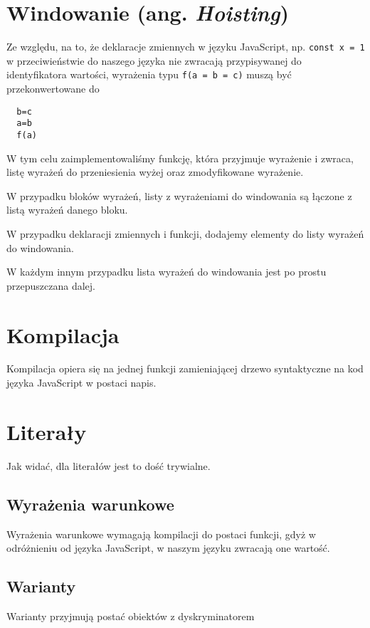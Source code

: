 \documentclass[a4paper,12pt]{book} %
\begin{document}
\section{Windowanie (ang. \emph{Hoisting})}
Ze względu, na to, że deklaracje zmiennych w języku JavaScript, np. \lstinline{const x = 1} w przeciwieństwie do naszego języka nie zwracają przypisywanej do identyfikatora wartości, wyrażenia typu \lstinline{f(a = b = c)} muszą być przekonwertowane do
\begin{lstlisting}
  b=c
  a=b
  f(a)
\end{lstlisting}
W tym celu zaimplementowaliśmy funkcję, która przyjmuje wyrażenie i zwraca, listę wyrażeń do przeniesienia wyżej oraz zmodyfikowane wyrażenie.

\newpage
W przypadku bloków wyrażeń, listy z wyrażeniami do windowania są łączone z listą wyrażeń danego bloku.



W przypadku deklaracji zmiennych i funkcji, dodajemy elementy do listy wyrażeń do windowania.

W każdym innym przypadku lista wyrażeń do windowania jest po prostu przepuszczana dalej.



\section{Kompilacja}
Kompilacja opiera się na jednej funkcji zamieniającej drzewo syntaktyczne na kod języka JavaScript w postaci napis.

\section{Literały}
Jak widać, dla literałów jest to dość trywialne.

\newpage
\subsection{Wyrażenia warunkowe}
Wyrażenia warunkowe wymagają kompilacji do postaci funkcji, gdyż w odróżnieniu od języka JavaScript, w naszym języku zwracają one wartość.


\subsection{Warianty}
Warianty przyjmują postać obiektów z dyskryminatorem

\end{document}
